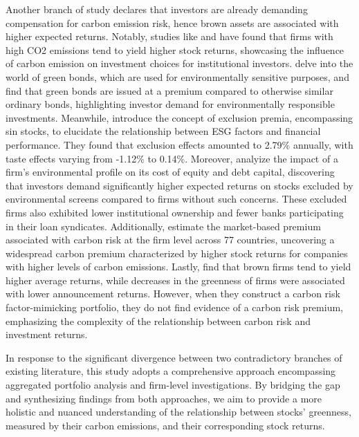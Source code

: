\documentclass[12pt]{article}
\begin{document}
Another branch of study declares that investors are already demanding compensation for carbon emission risk, hence brown assets are associated with higher expected returns. Notably, studies like \cite{bolton2021investors} and \cite{aswani2023carbon} have found that firms with high CO2 emissions tend to yield higher stock returns, showcasing the influence of carbon emission on investment choices for institutional investors. \cite{baker2018financing} delve into the world of green bonds, which are used for environmentally sensitive purposes, and find that green bonds are issued at a premium compared to otherwise similar ordinary bonds, highlighting investor demand for environmentally responsible investments. Meanwhile, \cite{zerbib2022sustainable} introduce the concept of exclusion premia, encompassing sin stocks, to elucidate the relationship between ESG factors and financial performance. They found that exclusion effects amounted to 2.79\% annually, with taste effects varying from -1.12\% to 0.14\%. Moreover, \cite{chava2014environmental} analyize the impact of a firm's environmental profile on its cost of equity and debt capital, discovering that investors demand significantly higher expected returns on stocks excluded by environmental screens compared to firms without such concerns. These excluded firms also exhibited lower institutional ownership and fewer banks participating in their loan syndicates. Additionally, \cite{bolton2021global} estimate the market-based premium associated with carbon risk at the firm level across 77 countries, uncovering a widespread carbon premium characterized by higher stock returns for companies with higher levels of carbon emissions. Lastly, \cite{gorgen2020carbon} find that brown firms tend to yield higher average returns, while decreases in the greenness of firms were associated with lower announcement returns. However, when they construct a carbon risk factor-mimicking portfolio, they do not find evidence of a carbon risk premium, emphasizing the complexity of the relationship between carbon risk and investment returns.

In response to the significant divergence between two contradictory branches of existing literature, this study adopts a comprehensive approach encompassing aggregated portfolio analysis and firm-level investigations. By bridging the gap and synthesizing findings from both approaches, we aim to provide a more holistic and nuanced understanding of the relationship between stocks' greenness, measured by their carbon emissions, and their corresponding stock returns.
\end{document}
